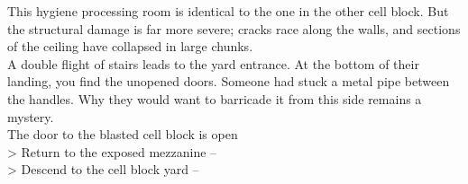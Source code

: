 This hygiene processing room is identical to the one in the other cell block. But the structural damage is far more severe; cracks race along the walls, and sections of the ceiling have collapsed in large chunks.\\

A double flight of stairs leads to the yard entrance. At the bottom of their landing, you find the unopened doors. Someone had stuck a metal pipe between the handles. Why they would want to barricade it from this side remains a mystery.\\
 The door to the blasted cell block is open\\

> Return to the exposed mezzanine -- \\
> Descend to the cell block yard -- 